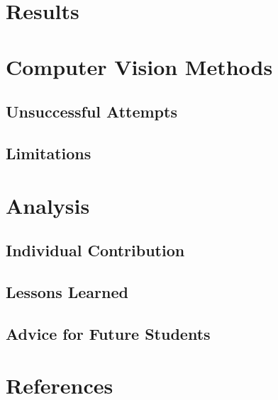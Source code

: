 \documentclass[12pt]{article}
\begin{document}
\section{Results}

\section{Computer Vision Methods}

\subsection{Unsuccessful Attempts}
\subsection{Limitations}

\section{Analysis}

\subsection{Individual Contribution}

\subsection{Lessons Learned}

\subsection{Advice for Future Students}

\section*{References}
\end{document}
